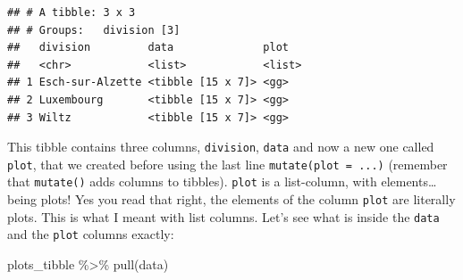 \documentclass[
]{article}
\newenvironment{Shaded}{\begin{snugshade}}{\end{snugshade}}
\newcommand{\FunctionTok}[1]{\textcolor[rgb]{0.00,0.00,0.00}{#1}}
\newcommand{\NormalTok}[1]{#1}
\newcommand{\SpecialCharTok}[1]{\textcolor[rgb]{0.00,0.00,0.00}{#1}}
\begin{document}
\begin{verbatim}
## # A tibble: 3 x 3
## # Groups:   division [3]
##   division         data              plot  
##   <chr>            <list>            <list>
## 1 Esch-sur-Alzette <tibble [15 x 7]> <gg>  
## 2 Luxembourg       <tibble [15 x 7]> <gg>  
## 3 Wiltz            <tibble [15 x 7]> <gg>
\end{verbatim}

This tibble contains three columns, \texttt{division}, \texttt{data} and now a new one called \texttt{plot}, that we
created before using the last line \texttt{mutate(plot\ =\ ...)} (remember that \texttt{mutate()} adds columns to
tibbles). \texttt{plot} is a list-column, with elements\ldots{} being plots! Yes you read that right, the
elements of the column \texttt{plot} are literally plots. This is what I meant with list columns.
Let's see what is inside the \texttt{data} and the \texttt{plot} columns exactly:

\begin{Shaded}
\begin{Highlighting}[]
\NormalTok{plots\_tibble }\SpecialCharTok{\%\textgreater{}\%}
  \FunctionTok{pull}\NormalTok{(data)}
\end{Highlighting}
\end{Shaded}
\end{document}
